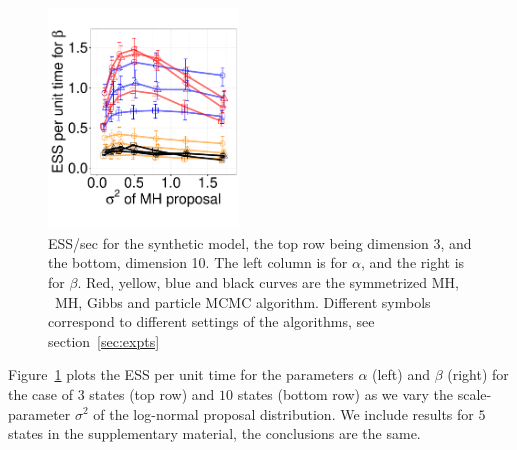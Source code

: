 \begin{figure}
\begin{minipage}[!hp]{0.75\linewidth}
    \includegraphics [width=0.45\textwidth, angle=0]{figures_new_apr12/exp_beta_dim10_18apr12.pdf}
    \vspace{-0 in}
  \end{minipage}
  \begin{minipage}[!hp]{0.24\linewidth}
    \caption{ESS/sec for the synthetic  model, the top row being dimension 3, and the bottom,
      dimension 10. The left column is for $\alpha$, and the 
    right is for $\beta$. Red, yellow, blue and black curves are the symmetrized MH,
  \naive\ MH, Gibbs and particle MCMC algorithm. Different symbols correspond
to different settings of the algorithms, see section~\ref{sec:expts}}
     \label{fig:ESS_EXP_D10}
  \end{minipage}
  \end{figure}
  Figure~\ref{fig:ESS_EXP_D10} plots the ESS per unit time for the parameters 
  $\alpha$ (left) and $\beta$ (right) for the
  case of $3$ states (top row) and $10$ states (bottom row) as we vary the scale-parameter $\sigma^2$ of the
  log-normal proposal distribution. We include results for $5$ states in the 
  supplementary material, the conclusions are the same. 
